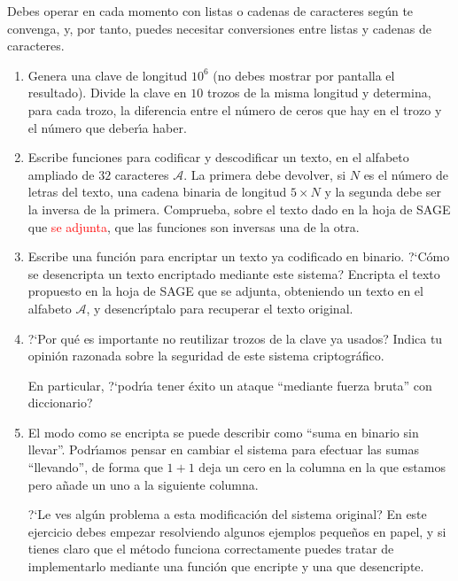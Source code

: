  \begin{ejer}
 
 {\sc Debes} operar en cada momento con listas o cadenas de caracteres seg\'un
te convenga, y, por tanto, puedes necesitar conversiones entre listas y cadenas
de caracteres.
 
 \begin{enumerate}
  \item Genera una clave de  longitud $10^6$ (no debes mostrar por
pantalla el resultado). Divide la clave en $10$ trozos de la misma longitud y
determina, para cada trozo, la diferencia entre el n\'umero de ceros que hay en
el trozo y el n\'umero que deber\'{\i}a haber. 

\item  Escribe funciones para codificar y descodificar un texto, en el
alfabeto ampliado de $32$ caracteres $\mathcal{A}$. La primera debe devolver, si
$N$ es el n\'umero de letras del texto,  una cadena binaria de longitud $5\times
N$ y la segunda debe ser la inversa de la primera. Comprueba, sobre el texto
dado en la hoja de SAGE que \textcolor{red}{se adjunta}, que las funciones son 
inversas una de la
otra.  


\item Escribe una funci\'on para encriptar un texto ya codificado en
binario. ?`C\'omo se desencripta un texto encriptado mediante este
sistema? Encripta  el texto propuesto en la hoja de SAGE que se
adjunta, obteniendo un texto en el alfabeto $\mathcal{A}$, y desencr\'{\i}ptalo
para recuperar el texto original.

\item  ?`Por qu\'e es importante no reutilizar trozos de la clave ya
usados? Indica tu opini\'on {\sc razonada} sobre la seguridad de este sistema
criptogr\'afico. 

En particular, ?`podr\'{\i}a tener \'exito un ataque ``mediante fuerza bruta''
con diccionario? 

\item  El modo como se encripta se puede describir como ``suma en
binario sin llevar''. Podr\'{\i}amos pensar en cambiar el sistema para efectuar
las sumas ``llevando'', de forma que $1+1$ deja un cero en la columna en la que
estamos pero a\~nade un uno a la siguiente columna. 
  
 ?`Le ves alg\'un problema a esta modificaci\'on del sistema original? {\sc En
este ejercicio debes  empezar}
resolviendo  algunos ejemplos peque\~nos en papel, y si tienes claro que el
m\'etodo funciona correctamente puedes tratar de implementarlo mediante una
funci\'on que encripte y una que desencripte.
 \end{enumerate}
 \end{ejer}


